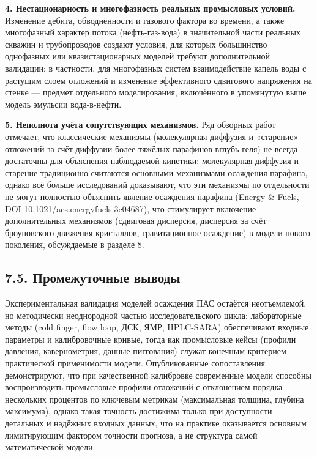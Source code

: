 \documentclass[11pt]{extarticle}
\begin{document}
\textbf{4. Нестационарность и многофазность реальных промысловых условий.} Изменение дебита, обводнённости и газового фактора во времени, а также многофазный характер потока (нефть-газ-вода) в значительной части реальных скважин и трубопроводов создают условия, для которых большинство однофазных или квазистационарных моделей требуют дополнительной валидации; в частности, для многофазных систем взаимодействие капель воды с растущим слоем отложений и изменение эффективного сдвигового напряжения на стенке --- предмет отдельного моделирования, включённого в упомянутую выше модель эмульсии вода-в-нефти.

\textbf{5. Неполнота учёта сопутствующих механизмов.} Ряд обзорных работ отмечает, что классические механизмы (молекулярная диффузия и «старение» отложений за счёт диффузии более тяжёлых парафинов вглубь геля) не всегда достаточны для объяснения наблюдаемой кинетики: молекулярная диффузия и старение традиционно считаются основными механизмами осаждения парафина, однако всё больше исследований доказывают, что эти механизмы по отдельности не могут полностью объяснить явление осаждения парафина (Energy \& Fuels, DOI 10.1021/acs.energyfuels.3c04687), что стимулирует включение дополнительных механизмов (сдвиговая дисперсия, дисперсия за счёт броуновского движения кристаллов, гравитационное осаждение) в модели нового поколения, обсуждаемые в разделе 8.

\subsection{7.5. Промежуточные выводы}\label{ux43fux440ux43eux43cux435ux436ux443ux442ux43eux447ux43dux44bux435-ux432ux44bux432ux43eux434ux44b}

Экспериментальная валидация моделей осаждения ПАС остаётся неотъемлемой, но методически неоднородной частью исследовательского цикла: лабораторные методы (cold finger, flow loop, ДСК, ЯМР, HPLC-SARA) обеспечивают входные параметры и калибровочные кривые, тогда как промысловые кейсы (профили давления, кавернометрия, данные пиггования) служат конечным критерием практической применимости модели. Опубликованные сопоставления демонстрируют, что при качественной калибровке современные модели способны воспроизводить промысловые профили отложений с отклонением порядка нескольких процентов по ключевым метрикам (максимальная толщина, глубина максимума), однако такая точность достижима только при доступности детальных и надёжных входных данных, что на практике оказывается основным лимитирующим фактором точности прогноза, а не структура самой математической модели.
\end{document}
